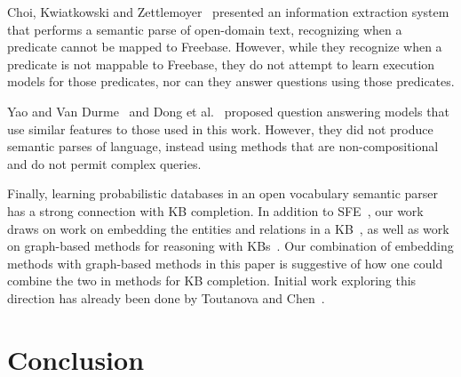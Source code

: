 \documentclass[11pt,letterpaper]{article}
\begin{document}
Choi, Kwiatkowski and Zettlemoyer~
presented an information extraction system that performs a semantic parse of open-domain text,
recognizing when a predicate cannot be mapped to Freebase.  However, while they recognize when a
predicate is not mappable to Freebase, they do not attempt to learn execution models for those
predicates, nor can they answer questions using those predicates.

Yao and Van Durme~ and Dong et
al.~ proposed question answering models that use similar
features to those used in this work.  However, they did not produce semantic parses of language,
instead using methods that are non-compositional and do not permit complex queries.

Finally, learning probabilistic databases in an open vocabulary semantic parser has a strong
connection with KB completion.  In addition to SFE~\cite{gardner-2015-sfe}, our work draws on work
on embedding the entities and relations in a
KB~\cite{riedel-2013-mf-universal-schema,nickel-2011-rescal,%
bordes-2013-transe,nickel-2014-are,toutanova-2015-joint-text-kb-embedding}, as well as work on
graph-based methods for reasoning with
KBs~\cite{lao-2010-original-pra,gardner-2014-vector-space-pra,neelakantan-2015-rnn-kbc}.  Our
combination of embedding methods with graph-based methods in this paper is suggestive of how one
could combine the two in methods for KB completion.  Initial work exploring this direction has
already been done by Toutanova and Chen~.


\section{Conclusion}
\label{sec:conclusion}
\end{document}
